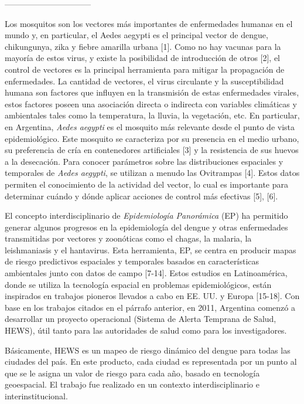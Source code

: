 --------------------------------





Los mosquitos son los vectores más importantes de enfermedades humanas en el
mundo y, en particular, el Aedes aegypti es el principal vector de dengue,
chikungunya, zika y fiebre amarilla urbana [1]. Como no hay vacunas para la
mayoría de estos virus, y existe la posibilidad de introducción de otros [2],
el control de vectores es la principal herramienta para mitigar la
propagación de enfermedades. La cantidad de vectores, el virus circulante y la
susceptibilidad humana son factores que influyen en la transmisión de estas
enfermedades virales, estos factores poseen una asociación directa o indirecta
con variables climáticas y ambientales tales como la temperatura, la lluvia,
la vegetación, etc. En particular, en Argentina, \textit{Aedes aegypti} es el
mosquito más relevante desde el punto de vista epidemiológico.
Este mosquito se caracteriza por su presencia en el medio urbano, su preferencia
de cría en contenedores artificiales [3] y la resistencia de sus huevos a la
desecación. Para conocer parámetros sobre las distribuciones espaciales y temporales
de \textit{Aedes aegypti}, se utilizan a menudo las Ovitrampas [4].
Estos datos permiten el conocimiento de la actividad del vector, lo cual es importante para determinar cuándo y
dónde aplicar acciones de control más efectivas [5], [6].

El concepto interdisciplinario de \textit{Epidemiología Panorámica} (EP)
ha permitido generar algunos progresos en la epidemiología del dengue y otras
enfermedades transmitidas por vectores y zoonóticas como el chagas, la
malaria, la leishmaniasis y el hantavirus. Esta herramienta, EP, se centra en
producir mapas de riesgo predictivos espaciales y temporales basados en
características ambientales junto con datos de campo [7-14].
Estos estudios en Latinoamérica, donde se utiliza la tecnología espacial en
problemas epidemiológicos, están inspirados en trabajos pioneros llevados a cabo
en EE. UU. y Europa [15-18].
Con base en los trabajos citados en el párrafo anterior, en 2011, Argentina
comenzó a desarrollar un proyecto operacional
(Sistema de Alerta Temprana de Salud, HEWS), útil tanto para las autoridades de
salud como para los investigadores.

Básicamente, HEWS es un mapeo de riesgo
dinámico del dengue para todas las ciudades del país. En este producto, cada
ciudad es representada por un punto al que se le asigna un valor de riesgo para
cada año, basado en tecnología geoespacial. El trabajo fue realizado en un
contexto interdisciplinario e interinstitucional.

